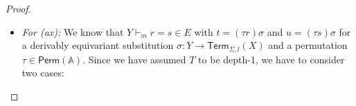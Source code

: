 \documentclass[a4paper,UKenglish,cleveref,thm-restate,numberwithinsect,final]{lipics-v2021}
\newcommand{\Perm}{\mathsf{Perm}(\Names)}
\newcommand{\Term}{\mathsf{Term}}
\newcommand{\sig}{\Sigma}
\newcommand{\sigf}{\Sigma_{\mathsf f}}
\newcommand{\sigb}{\Sigma_{\mathsf b}}
\newcommand{\Names}{\mathbb{A}}
\theoremstyle{plain}
\numberwithin{equation}{section}
\newcommand{\+}[1]{\mathcal{#1}\xspace}
\theoremstyle{definition}
\begin{document}
\begin{proof}
\begin{enumerate}[wide]
\begin{itemize}
                    If \(d(f) = 1\), then we have
                    \begin{align*}
                        &\bar{q}([t]_{1 + n}) \\
                        =~&q([s^n_X(f(t_1, \ldots, t_p))]_1) && \text{definition of } \bar{q} \\
                        =~&q([f([t_1]_n, \ldots, [t_p]_n)]_1) && \text{definition of } s^n_X \\
                        =~&q([f([u_1]_n, \ldots, [u_p]_n)]_1) && \text{assumption} \\
                        =~&q([s^n_X(f(u_1, \ldots, u_p))]_1) && \text{definition of } s^n_X \\
                        =~&\bar{q}([u]_{1 + n}) && \text{definition of } \bar{q}.
                    \end{align*}
                    The cases for $f\in\sigf$ and $f\in\sigb$ are analogous.
                \item
                    \textit{For (ax):}
                    We know that \(Y \vdash_m r = s \in E\) with \(t = (\tau r)\sigma\) and \(u = (\tau s)\sigma\) for a derivably equivariant substitution \(\sigma: Y \to \Term_{\sig, l}(X)\) and a permutation \(\tau \in \Perm\).
                    Since we have assumed \(T\) to be depth-1, we have to consider two cases:


\end{itemize}
\end{enumerate}
\end{proof}
\end{document}

